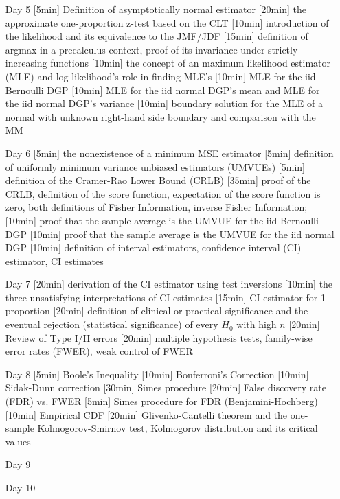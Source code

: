 \begin{enumerate}
\item[Day 5] [5min] Definition of asymptotically normal estimator  [20min] the approximate one-proportion z-test based on the CLT [10min] introduction of the likelihood and its equivalence to the JMF/JDF [15min] definition of argmax in a precalculus context, proof of its invariance under strictly increasing functions [10min] the concept of an maximum likelihood estimator (MLE) and log likelihood's role in finding MLE's [10min] MLE for the iid Bernoulli DGP [10min] MLE for the iid normal DGP's mean and MLE for the iid normal DGP's variance [10min] boundary solution for the MLE of a normal with unknown right-hand side boundary and comparison with the MM

\item[Day 6] [5min] the nonexistence of a minimum MSE estimator [5min] definition of uniformly minimum variance unbiased estimators (UMVUEs)  [5min] definition of the Cramer-Rao Lower Bound (CRLB) [35min] proof of the CRLB, definition of the score function, expectation of the score function is zero, both definitions of Fisher Information, inverse Fisher Information; [10min] proof that the sample average is the UMVUE for the iid Bernoulli DGP [10min] proof that the sample average is the UMVUE for the iid normal DGP [10min] definition of interval estimators, confidence interval (CI) estimator, CI estimates

\item[Day 7] [20min] derivation of the CI estimator using test inversions [10min] the three unsatisfying interpretations of CI estimates [15min] CI estimator for 1-proportion [20min] definition of clinical or practical significance and the eventual rejection (statistical significance) of every $H_0$ with high $n$ [20min] Review of Type I/II errors [20min] multiple hypothesis tests, family-wise error rates (FWER), weak control of FWER

\item[Day 8] [5min] Boole's Inequality [10min] Bonferroni's Correction [10min] Sidak-Dunn correction [30min] Simes procedure [20min] False discovery rate (FDR) vs. FWER [5min] Simes procedure for FDR (Benjamini-Hochberg) [10min] Empirical CDF [20min] Glivenko-Cantelli theorem and the one-sample Kolmogorov-Smirnov test, Kolmogorov distribution and its critical values


\item[Day 9] 
\item[Day 10] 


\end{enumerate}
